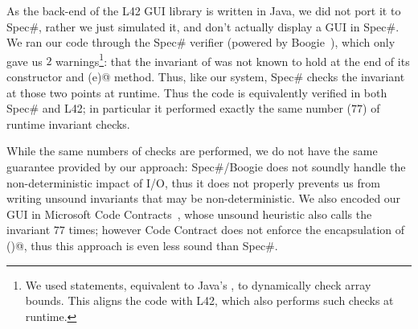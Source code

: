 As the back-end of the L42 GUI library is written in Java, we did not port it to Spec\#, rather we just simulated it, and don't actually display a GUI in Spec\#.
We ran our code through the Spec\# verifier (powered by Boogie~\cite{DBLP:conf/fmco/BarnettCDJL05}), which only gave us $2$ warnings\footnote{We used \Q@assume@ statements, equivalent to Java's \Q@assert@, to dynamically check array bounds. %
This aligns the code with L42, which also performs such checks at runtime.}: that the invariant of \Q@SafeMovable@ was not known to hold at the end of its constructor and \Q@dispatch(e)@ method. Thus, like our system, Spec\# checks the invariant
at those two points at runtime. Thus the code is equivalently verified in both Spec\# and L42; in particular it performed exactly the same number ($77$) of runtime invariant checks.

While the same numbers of checks are performed, we do not have the same guarantee provided by our approach:  Spec\#/Boogie does not soundly handle the non-deterministic impact of I/O, thus 
it does not properly prevents us from writing unsound
invariants that may be non-deterministic.
We also encoded our GUI in Microsoft Code Contracts~\cite{DBLP:conf/sac/FahndrichBL10}, whose unsound heuristic also calls the invariant $77$ times; however Code Contract does not enforce the
encapsulation of \Q@children()@, thus this approach is even less sound than Spec\#.



